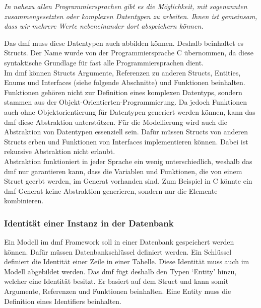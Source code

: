 \documentclass[./einleitung.tex]{subfiles}
\begin{document}
    \begin{center}
        \textit{
            In nahezu allen Programmiersprachen gibt es die Möglichkeit, mit sogenannten zusammengesetzten oder komplexen Datentypen zu arbeiten. Ihnen ist gemeinsam, dass wir mehrere Werte nebeneinander dort abspeichern können.\cite{978-3-8348-9999-6.pdf}}
    \end{center}
    Das \acrshort{dmf} muss diese Datentypen auch abbilden können.
    Deshalb beinhaltet es Structs.
    Der Name wurde von der Programmiersprache C übernommen, da diese syntaktische Grundlage für fast alle Programmiersprachen dient. \\
    Im \acrshort{dmf} können Structs Argumente, Referenzen zu anderen Structs, Entities, Enums und Interfaces (siehe folgende Abschnitte) und Funktionen beinhalten.
    Funktionen gehören nicht zur Definition eines komplexen Datentyps, sondern stammen aus der Objekt-Orientierten-Programmierung.
    Da jedoch Funktionen auch ohne Objektorientierung für Datentypen generiert werden können, kann das \acrshort{dmf} diese Abstraktion unterstützen.
    \newline
    Für die Modellierung wird auch die Abstraktion von Datentypen essenziell sein.
    Dafür müssen Structs von anderen Structs erben und Funktionen von Interfaces implementieren können.
    Dabei ist rekursive Abstraktion nicht erlaubt.\\
    Abstraktion funktioniert in jeder Sprache ein wenig unterschiedlich, weshalb das \acrshort{dmf} nur garantieren kann, dass die Variablen und Funktionen, die von einem Struct geerbt werden, im Generat vorhanden sind.
    Zum Beispiel in C könnte ein \acrshort{dmf} Generat keine Abstraktion generieren, sondern nur die Elemente kombinieren.

    \subsubsection{Identität einer Instanz in der Datenbank}
    Ein Modell im \acrshort{dmf} Framework soll in einer Datenbank gespeichert werden können.
    Dafür müssen Datenbankschlüssel definiert werden.
    Ein Schlüssel definiert die Identität einer Zeile in einer Tabelle.
    Diese Identität muss auch im Modell abgebildet werden.
    Das \acrshort{dmf} fügt deshalb den Typen `Entity' hinzu, welcher eine Identität besitzt.
    Er basiert auf dem Struct und kann somit Argumente, Referenzen und Funktionen beinhalten.
    Eine Entity muss die Definition eines Identifiers beinhalten. \\
\end{document}
